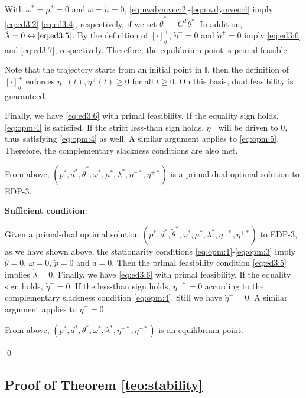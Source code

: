 \documentclass[journal,12pt,onecolumn,draftclsnofoot]{IEEEtran}
\begin{document}
With $\omega^*=\mu^*=0$ and $\dot{\omega}=\dot{\mu}=0$, \eqref{eq:nwdymvec:2}-\eqref{eq:nwdymvec:4} imply \eqref{eq:ed3:2}-\eqref{eq:ed3:4}, respectively, if we set $\tilde{\theta}^*=C^T \theta^*$. In addition, $\dot \lambda =0 \leftrightarrow \eqref{eq:ed3:5}$. By the definition of $[\cdot]^+_\eta$, $\dot \eta^- =0$ and $\dot \eta^+=0$ imply \eqref{eq:ed3:6} and \eqref{eq:ed3:7}, respectively. Therefore, the equilibrium point is primal feasible.

Note that the trajectory starts from an initial point in $\mathbb{I}$, then the definition of $[\cdot]^+_\eta$ enforces $\eta^-(t),\eta^+(t)\ge 0$ for all $t\ge 0$. On this basis, dual feasibility is guaranteed.

Finally, we have \eqref{eq:ed3:6} with primal feasibility. If the equality sign holds, \eqref{eq:opm:4} is satisfied. If the strict less-than sign holds, $\eta^-$ will be driven to $0$, thus satisfying \eqref{eq:opm:4} as well. A similar argument applies to \eqref{eq:opm:5}. Therefore, the complementary slackness conditions are also met. 

From above, $(p^*,d^*,\tilde{\theta}^*,\omega^*,\mu^*,\lambda^*,\eta^{-*},\eta^{+*})$ is a primal-dual optimal solution to EDP-3.   


 
\noindent
\textbf{Sufficient condition}:
 
Given a primal-dual optimal solution $(p^*,d^*,\tilde{\theta}^*,\omega^*,\mu^*,\lambda^*,\eta^{-*},\eta^{+*})$ to EDP-3, as we have shown above, the stationarity conditions \eqref{eq:opm:1}-\eqref{eq:opm:3} imply $\dot{\theta}=0$, $\dot \omega =0$, $\dot p =0$ and $\dot d=0$. Then the primal feasibility condition \eqref{eq:ed3:5} implies $\dot \lambda = 0$. Finally, we have \eqref{eq:ed3:6} with primal feasibility. If the equality sign holds, $\dot \eta^- =0$. If the less-than sign holds, $\eta^{-*}=0$ according to the complementary slackness condition \eqref{eq:opm:4}. Still we have $\dot \eta^- =0$. A similar argument applies to $\dot \eta^+ =0$.

From above, $(p^*,d^*,\theta^*,\omega^*,\lambda^*,\eta^{-*},\eta^{+*})$ is an equilibrium point.  

\qed


\subsection{Proof of Theorem \ref{teo:stability}}
	
\end{document}
